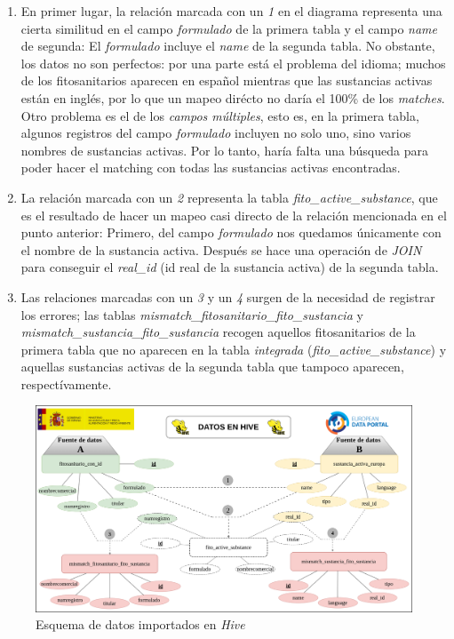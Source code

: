 \begin{enumerate}
\item En primer lugar, la relación marcada con un \textit{1} en el diagrama representa una cierta similitud en el campo \textit{formulado} de la primera tabla y el campo \textit{name} de segunda: El \textit{formulado} incluye el \textit{name} de la segunda tabla. No obstante, los datos no son perfectos: por una parte está el problema del idioma; muchos de los fitosanitarios aparecen en español mientras que las sustancias activas están en inglés, por lo que un mapeo dirécto no daría el 100\% de los \textit{matches}. Otro problema es el de los \textit{campos múltiples}, esto es, en la primera tabla, algunos registros del campo \textit{formulado} incluyen no solo uno, sino varios nombres de sustancias activas. Por lo tanto, haría falta una búsqueda para poder hacer el matching con todas las sustancias activas encontradas.
\item La relación marcada con un \textit{2} representa la tabla \textit{fito\_active\_substance}, que es el resultado de hacer un mapeo casi directo de la relación mencionada en el punto anterior: Primero, del campo \textit{formulado} nos quedamos únicamente con el nombre de la sustancia activa. Después se hace una operación de \textit{JOIN} para conseguir el \textit{real\_id} (id real de la sustancia activa) de la segunda tabla.
\item Las relaciones marcadas con un \textit{3} y un \textit{4} surgen de la necesidad de registrar los errores; las tablas \textit{mismatch\_fitosanitario\_fito\_sustancia} y \textit{mismatch\_sustancia\_fito\_sustancia} recogen aquellos fitosanitarios de la primera tabla que no aparecen en la tabla \textit{integrada} (\textit{fito\_active\_substance}) y aquellas sustancias activas de la segunda tabla que tampoco aparecen, respectívamente.
\end{enumerate}

\begin{landscape}
\begin{figure}[p!]
    \centering
    \includegraphics[width=\linewidth]{Imagenes/datoshive}
    \caption{Esquema de datos importados en \textit{Hive}}
    \label{fig:datoshive}
\end{figure}
\end{landscape}





